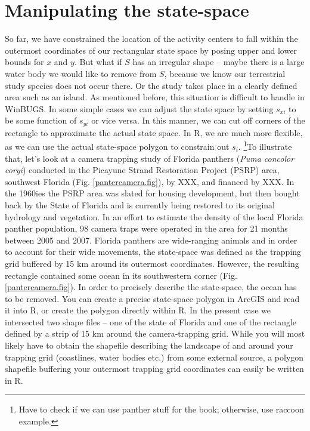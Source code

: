 \section{Manipulating the state-space}
So far, we have constrained the location of the activity centers to fall within the outermost coordinates of our rectangular state space by posing upper and lower bounds for $x$ and $y$. But what if $S$ has an irregular shape -- maybe there is a large water body we would like to remove from $S$, because we know our terrestrial study species does not occur there. Or the study takes place in a clearly defined area such as an island. As mentioned before, this situation is difficult to handle in WinBUGS. In some simple cases we can adjust the state space by setting $s_{xi}$ to be some function of $s_{yi}$ or vice versa. In this manner, we can cut off corners of the rectangle to approximate the actual state space. In R, we are much more flexible, as we can use the actual state-space polygon to constrain out $s_i$. \footnote{ Have to check if we can use panther stuff for the book; otherwise, use raccoon example.}To illustrate that, let's look at a camera trapping study of Florida panthers (\emph{Puma concolor coryi}) conducted in the Picayune Strand Restoration Project (PSRP) area, southwest Florida (Fig. \ref{pantercamera.fig}), by XXX, and financed by XXX. In the 1960ies the PSRP area was slated for housing development, but then bought back by the State of Florida and is currently being restored to its original hydrology and vegetation. In an effort to estimate the density of the local Florida panther population, 98 camera traps were operated in the area for 21 months between 2005 and 2007. Florida panthers are wide-ranging animals and in order to account for their wide movements, the state-space was defined as the trapping grid buffered by 15 km around its outermost coordinates. However, the resulting rectangle contained some ocean in its southwestern corner (Fig. \ref{pantercamera.fig}).
In order to precisely describe the state-space, the ocean has to be removed. You can create a precise state-space polygon in ArcGIS and read it into R, or create the polygon directly within R. In the present case we intersected two shape files -- one of the state of Florida and one of the rectangle defined by a strip of 15 km around the camera-trapping grid.
While you will most likely have to obtain the shapefile describing the landscape of and around your trapping grid (coastlines, water bodies etc.) from some external source, a polygon shapefile buffering your outermost trapping grid coordinates can easily be written in R.

